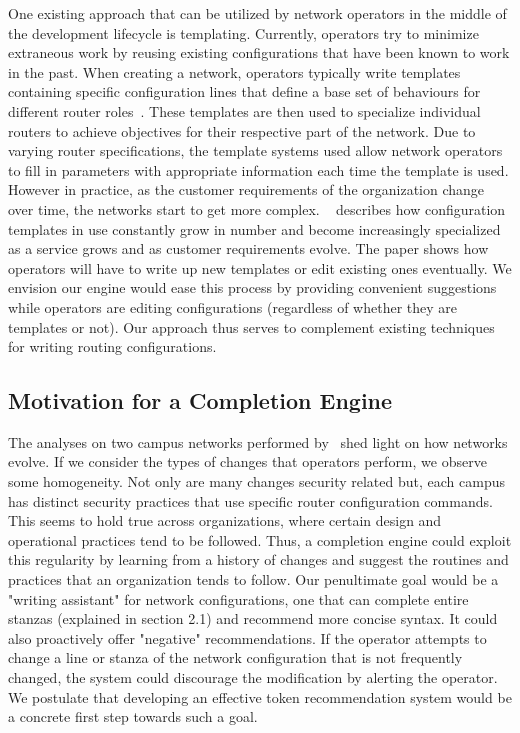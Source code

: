 One existing approach that can be utilized by network operators in the middle of the development lifecycle is templating. Currently, operators try to minimize extraneous work by reusing existing configurations that have been known to work in the past. When creating a network, operators typically write templates containing specific configuration lines that define a base set of behaviours for different router roles~\cite{complexity}. These templates are then used to specialize individual routers to achieve objectives for their respective part of the network. Due to varying router specifications, the template systems used allow network operators to fill in parameters with appropriate information each time the template is used. However in practice, as the customer requirements of the organization change over time, the networks start to get more complex. ~\cite{Benson} describes how configuration templates in use constantly grow in number and become increasingly specialized as a service grows and as customer requirements evolve. The paper shows how operators will have to write up new templates or edit existing ones eventually. We envision our engine would ease this process by providing convenient suggestions while operators are editing configurations (regardless of whether they are templates or not).
Our approach thus serves to complement existing techniques for writing routing configurations.\\ 

\subsection{Motivation for a Completion Engine}

The analyses on two campus networks performed by~\cite{Kim} shed light on how networks evolve. If we consider the types of changes that operators perform, we observe some homogeneity. Not only are many changes security related but, each campus has distinct security practices that use specific router configuration commands. This seems to hold true across organizations, where certain design and operational practices tend to be followed. Thus, a completion engine could exploit this regularity by learning from a history of changes and suggest the routines and practices that an organization tends to follow. Our penultimate goal would be a "writing assistant" for network configurations, one that can complete entire stanzas (explained in section 2.1) and recommend more concise syntax. It could also proactively offer "negative" recommendations. If the operator attempts to change a line or stanza of the network configuration that is not frequently changed, the system could discourage the modification by alerting the operator. We postulate that developing an effective token recommendation system would be a concrete first step towards such a goal.\\

